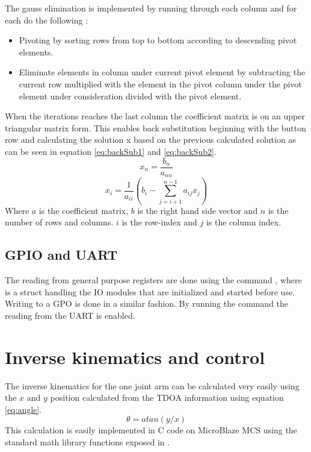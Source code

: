 The gauss elimination is implemented by running through each column and for each do the following \cite{gauss}:
\begin{itemize}
	\item Pivoting by sorting rows from top to bottom according to descending pivot elements.
	\item Eliminate elements in column under current pivot element by subtracting the current row multiplied with the element in the pivot column under the pivot element under consideration divided with the pivot element.
\end{itemize}
When the iterations reaches the last column the coefficient matrix is on an upper triangular matrix form. This enables back substitution beginning with the button row and calculating the solution x based on the previous calculated solution as can be seen in equation \eqref{eq:backSub1} and \eqref{eq:backSub2}.
\begin{equation}
	x_n = \frac{b_n}{a_{nn}}
	\label{eq:backSub1}
\end{equation}
\begin{equation}
	x_i = \frac{1}{a_{ii}} (b_i - \sum_{j=i+1}^{n-1} a_{ij}x_j)
	\label{eq:backSub2}
\end{equation}
Where $a$ is the coefficient matrix, $b$ is the right hand side vector and $n$ is the number of rows and columns. $i$ is the row-index and $j$ is the column index.

\subsection{GPIO and UART}
The reading from general purpose registers are done using the command , where  is a struct handling the IO modules that are initialized and started before use.
Writing to a GPO is done in a similar fashion.
By running the command  the reading from the UART is enabled.

\section{Inverse kinematics and control }
\label{sec:mechanics_kinematics}
The inverse kinematics for the one joint arm can be calculated very easily using the $x$ and $y$ position calculated from the TDOA information using equation \eqref{eq:angle}.
\begin{equation}
\theta = atan(y/x)
\label{eq:angle}
\end{equation}
This calculation is easily implemented in C code on MicroBlaze MCS using the standard math library functions exposed in .

